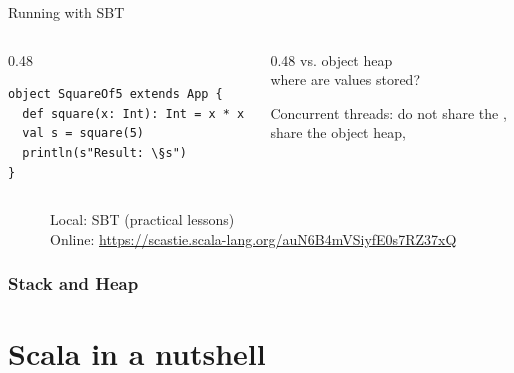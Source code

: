 \documentclass[aspectratio=169]{beamer}
\begin{document}
\begin{frame}[fragile]{Running with SBT}
~\\[-8mm]
\begin{columns}
\begin{column}{0.48\textwidth}
\begin{lstlisting}
object SquareOf5 extends App {
  def square(x: Int): Int = x * x
  val s = square(5)
  println(s"Result: \§s")
}
\end{lstlisting}
\end{column}
\begin{column}{0.48\textwidth}
 vs. \alert{object heap}
\\[2mm]
where are values stored?
\\[5mm]
\begin{block}{Concurrent threads:}
do not share the ,
\\share the \alert{object heap},  
\end{block}
\end{column}
\end{columns}

\pause
\bigskip
~~~~~~\alert{Local:} SBT (practical lessons)\\
~~~~~~\alert{Online:} \url{https://scastie.scala-lang.org/auN6B4mVSiyfE0s7RZ37xQ}
\end{frame}


\begin{frame}\frametitle{Stack and Heap}
    \centering
    

\end{frame}

\section{Scala in a nutshell}
\end{document}
